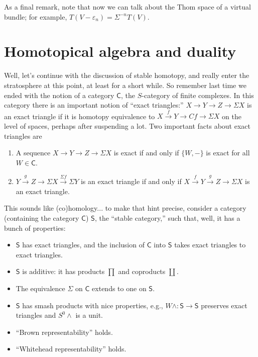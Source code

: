 \documentclass{article}
\providecommand{\OutputHomotopicalAlgebraAndDuality}{18}
\newcommand{\BoxedNote}[1]{
\begin{center}\fbox{\begin{minipage}{.75\textwidth}
#1
\end{minipage}}
\end{center}
}
\newcommand{\sprod}{\wedge}
\newcommand{\CatOf}[1]{\mathsf{#1}}
\newcommand{\Suspend}{\Sigma}
\begin{document}
As a final remark, note that now we can talk about the Thom space of a virtual bundle; for example, $T(V - \varepsilon_n) = \Suspend^{-n} T(V)$.

\fi
\BoxedNote{}
\section{Homotopical algebra and duality} %
\label{HomotopicalAlgebraAndDuality}
\ifx\OutputHomotopicalAlgebraAndDuality\undefined\else
Well, let's continue with the discussion of stable homotopy, and really enter the stratosphere at this point, at least for a short while.  So remember last time we ended with the notion of a category $\CatOf{C}$, the $S$-category of finite complexes.  In this category there is an important notion of ``exact triangles:'' $X \to Y \to Z \to \Suspend X$ is an exact triangle if it is homotopy equivalence to $X \stackrel{f}{\to} Y \to Cf \to \Suspend X$ on the level of spaces, perhaps after suspending a lot.  Two important facts about exact triangles are
\begin{enumerate}
\item A sequence $X \to Y \to Z \to \Suspend X$ is exact if and only if $\{W, -\}$ is exact for all $W \in \CatOf{C}$.
\item $Y \stackrel{g}{\to} Z \to \Suspend X \stackrel{\Suspend f}{\to} \Suspend Y$ is an exact triangle if and only if $X \stackrel{f}{\to} Y \stackrel{g}{\to} Z \to \Suspend X$ is an exact triangle.
\end{enumerate}
This sounds like (co)homology... to make that hint precise, consider a category (containing the category $\CatOf{C}$) $\CatOf{S}$, the ``stable category,'' such that, well, it has a bunch of properties:
\begin{itemize}
\item $\CatOf{S}$ has exact triangles, and the inclusion of $\CatOf{C}$ into $\CatOf{S}$ takes exact triangles to exact triangles.
\item $\CatOf{S}$ is additive: it has products $\prod$ and coproducts $\coprod$.
\item The equivalence $\Suspend$ on $\CatOf{C}$ extends to one on $\CatOf{S}$.
\item $\CatOf{S}$ has smash products with nice properties, e.g., $W \sprod: \CatOf{S} \to \CatOf{S}$ preserves exact triangles and $S^0 \sprod$ is a unit.
\item ``Brown representability'' holds.
\item ``Whitehead representability'' holds.
\end{itemize}
\end{document}
